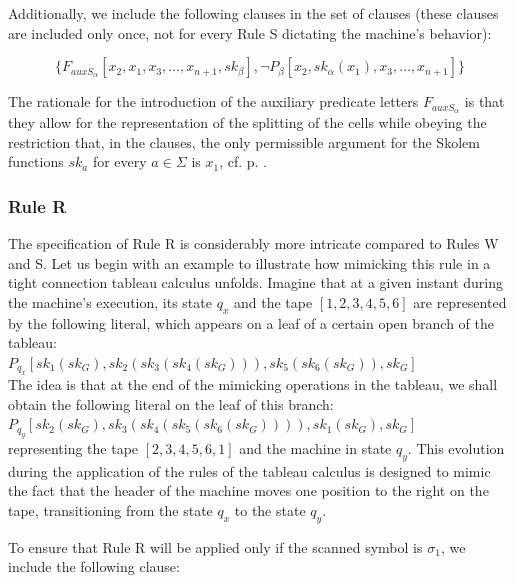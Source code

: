 \documentclass[%
  manuscript=article,   %
  year=2024,
  volume=77,
  doi=00000.000,
]{zfn}
\begin{document}
Additionally, we include the following clauses in the set of clauses (these clauses are included only once, not for every Rule S dictating the machine's behavior):

\begin{equation}
 \{F_{auxS_{\alpha}}[x_2, x_1, x_3, \ldots, x_{n+1}, sk_\beta], \neg P_\beta[x_2, sk_\alpha(x_1), x_3, \ldots, x_{n+1}]\}
\end{equation}

The rationale for the introduction of the auxiliary predicate letters $F_{auxS_{\alpha}}$ is that they allow for the representation of the splitting of the cells while obeying the restriction that, in the clauses, the only permissible argument for the Skolem functions $sk_a$ for every $a \in \Sigma$ is $x_1$, cf. p. \pageref{x1rest}.

\subsubsection{Rule R}

The specification of Rule R is considerably more intricate compared to Rules W and S. Let us begin with an example to illustrate how mimicking this rule in a tight connection tableau calculus unfolds. Imagine that at a given instant during the machine's execution, its state $q_x$ and the tape $[1,2,3,4,5,6]$ are represented by the following literal, which appears on a leaf of a certain open branch of the tableau:\\

$P_{q_x}[sk_1(sk_G), sk_2(sk_3(sk_4(sk_G))), sk_5(sk_6(sk_G)), sk_G]$\\

The idea is that at the end of the mimicking operations in the tableau, we shall obtain the following literal on the leaf of this branch:\\

$P_{q_y}[sk_2(sk_G), sk_3(sk_4(sk_5(sk_6(sk_G)))), sk_1(sk_G), sk_G]$\\

\noindent representing the tape $[2,3,4,5,6,1]$ and the machine in state $q_y$. This evolution during the application of the rules of the tableau calculus is designed to mimic the fact that the header of the machine moves one position to the right on the tape, transitioning from the state $q_x$ to the state $q_y$.

To ensure that Rule R will be applied only if the scanned symbol is $\sigma_1$, we include the following clause:
\end{document}
